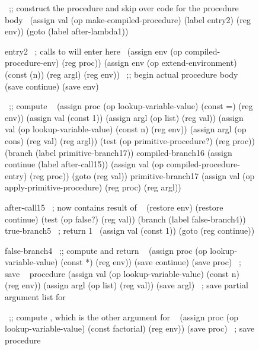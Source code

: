 \begin{figure}
	\centering
	\begin{smallscheme}
	  ~\textrm{;; construct the procedure and skip over code for the procedure body}~
	    (assign val
	            (op make-compiled-procedure)
	            (label entry2)
	            (reg env))
	    (goto (label after-lambda1))

	  entry2     ~\textrm{; calls to  will enter here}~
	    (assign env (op compiled-procedure-env) (reg proc))
	    (assign env
	            (op extend-environment)
	            (const (n))
	            (reg argl)
	            (reg env))
	  ~\textrm{;; begin actual procedure body}~
	    (save continue)
	    (save env)

	  ~\textrm{;; compute }~
	    (assign proc
	            (op lookup-variable-value)
	            (const =)
	            (reg env))
	    (assign val (const 1))
	    (assign argl (op list) (reg val))
	    (assign val
	            (op lookup-variable-value)
	            (const n)
	            (reg env))
	    (assign argl (op cons) (reg val) (reg argl))
	    (test (op primitive-procedure?) (reg proc))
	    (branch (label primitive-branch17))
	  compiled-branch16
	    (assign continue (label after-call15))
	    (assign val (op compiled-procedure-entry) (reg proc))
	    (goto (reg val))
	  primitive-branch17
	    (assign val
	            (op apply-primitive-procedure)
	            (reg proc)
	            (reg argl))

	  after-call15   ~\textrm{;  now contains result of }~
	    (restore env)
	    (restore continue)
	    (test (op false?) (reg val))
	    (branch (label false-branch4))
	  true-branch5  ~\textrm{; return 1}~
	    (assign val (const 1))
	    (goto (reg continue))

	  false-branch4
	  ~\textrm{;; compute and return }~
	    (assign proc
	            (op lookup-variable-value)
	            (const *)
	            (reg env))
	    (save continue)
	    (save proc)   ~\textrm{; save \code{*}}~ procedure
	    (assign val
	            (op lookup-variable-value)
	            (const n)
	            (reg env))
	    (assign argl (op list) (reg val))
	    (save argl)   ~\textrm{; save partial argument list for \code{*}}~

	  ~\textrm{;; compute , which is the other argument for \code{*}}~
	    (assign proc
	            (op lookup-variable-value)
	            (const factorial)
	            (reg env))
	    (save proc)  ~\textrm{; save  procedure}~


\end{smallscheme}
\end{figure}
